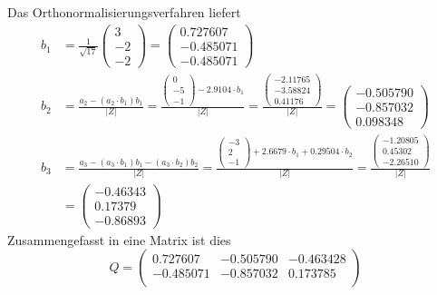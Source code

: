 \begin{loesung}
\begin{teilaufgaben}
\item
Das Orthonormalisierungsverfahren liefert 
\begin{align*}
b_1
&=
\frac1{\sqrt{17}} \begin{pmatrix}3\\-2\\-2\end{pmatrix}
=
\begin{pmatrix}
   0.727607\\
  -0.485071\\
  -0.485071
\end{pmatrix}
\\
b_2
&=
\frac{a_2-(a_2\cdot b_1)b_1}{|Z|}
=
\frac{
\begin{pmatrix}0\\-5\\-1\end{pmatrix} - 2.9104\cdot b_1
}{|Z|}
=
\frac{\begin{pmatrix}
  -2.11765\\
  -3.58824\\
   0.41176
\end{pmatrix}}{|Z|}
=
\begin{pmatrix}
  -0.505790\\
  -0.857032\\
   0.098348
\end{pmatrix}
\\
b_3
&=
\frac{a_3-(a_3\cdot b_1)b_1-(a_3\cdot b_2)b_2}{|Z|}
=
\frac{\begin{pmatrix}-3\\2\\-1\end{pmatrix} +2.6679\cdot b_1 +0.29504\cdot b_2}{|Z|}
=
\frac{\begin{pmatrix}
  -1.20805\\
   0.45302\\
  -2.26510
\end{pmatrix}}{|Z|}
\\
&=
\begin{pmatrix}
  -0.46343\\
   0.17379\\
  -0.86893
\end{pmatrix}
\end{align*}
Zusammengefasst in eine Matrix ist dies 
\[
Q=\begin{pmatrix}
   0.727607& -0.505790& -0.463428\\
  -0.485071& -0.857032&  0.173785\\

\end{pmatrix}\]
\end{teilaufgaben}
\end{loesung}
